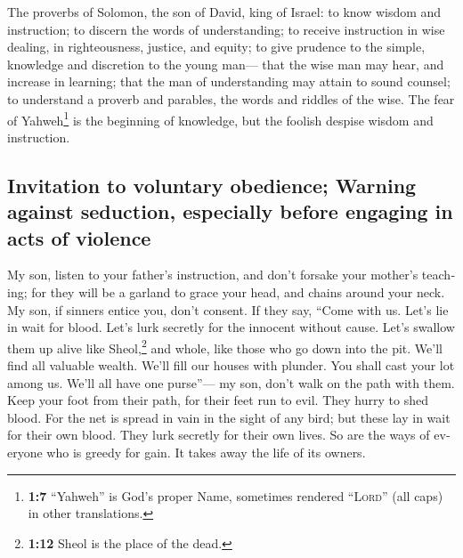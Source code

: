 \begin{paracol}{2}
\begin{otherlanguage}{english}
 The proverbs of Solomon, the son of David, king of
Israel:  to know wisdom and instruction; to discern the
words of understanding;  to receive instruction in wise
dealing, in righteousness, justice, and equity;  to give
prudence to the simple, knowledge and discretion to the young man---
 that the wise man may hear, and increase in learning;
that the man of understanding may attain to sound counsel;
 to understand a proverb and parables, the words and
riddles of the wise.  The fear of Yahweh\footnote{\textbf{1:7}
  ``Yahweh'' is God's proper Name, sometimes rendered ``\textsc{Lord}''
  (all caps) in other translations.} is the beginning of knowledge, but
the foolish despise wisdom and instruction.

\hypertarget{invitation-to-voluntary-obedience-warning-against-seduction-especially-before-engaging-in-acts-of-violence}{%
\subsection{Invitation to voluntary obedience; Warning against
seduction, especially before engaging in acts of
violence}\label{invitation-to-voluntary-obedience-warning-against-seduction-especially-before-engaging-in-acts-of-violence}}

 My son, listen to your father's instruction, and don't
forsake your mother's teaching;  for they will be a
garland to grace your head, and chains around your neck. 
My son, if sinners entice you, don't consent.  If they
say, ``Come with us. Let's lie in wait for blood. Let's lurk secretly
for the innocent without cause.  Let's swallow them up
alive like Sheol,\footnote{\textbf{1:12} Sheol is the place of the dead.}
and whole, like those who go down into the pit.  We'll
find all valuable wealth. We'll fill our houses with plunder.
 You shall cast your lot among us. We'll all have one
purse''---  my son, don't walk on the path with them.
Keep your foot from their path,  for their feet run to
evil. They hurry to shed blood.  For the net is spread in
vain in the sight of any bird;  but these lay in wait for
their own blood. They lurk secretly for their own lives. 
So are the ways of everyone who is greedy for gain. It takes away the
life of its owners.

\hypertarget{wisdoms-call-to-willingly-obey-her-commandments-threats-to-the-reluctant}{%
}
\end{otherlanguage}
\end{paracol}
